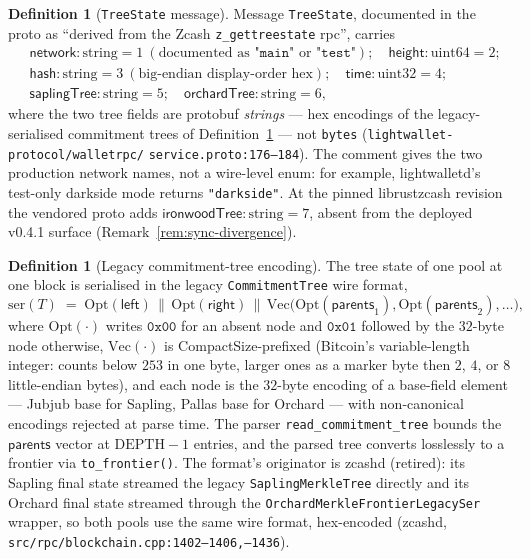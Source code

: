 \documentclass[11pt,a4paper]{article}
\theoremstyle{definition}
\newtheorem{definition}[theorem]{Definition}
\begin{document}
\begin{definition}[\texttt{TreeState} message]\label{def:sync-treestate}
Message \texttt{TreeState}, documented in the proto as ``derived from
the Zcash \texttt{z\_gettreestate} rpc'', carries
\[
\begin{aligned}
&\mathsf{network} : \text{string} = 1
  \ (\text{documented as }\texttt{"main"}\text{ or }\texttt{"test"}); \quad
 \mathsf{height} : \text{uint64} = 2; \\
&\mathsf{hash} : \text{string} = 3
  \ (\text{big-endian display-order hex}); \quad
 \mathsf{time} : \text{uint32} = 4; \\
&\mathsf{saplingTree} : \text{string} = 5; \quad
 \mathsf{orchardTree} : \text{string} = 6,
\end{aligned}
\]
where the two tree fields are protobuf \emph{strings} --- hex encodings
of the legacy-serialised commitment trees of
Definition~\ref{def:sync-legacy-ser} --- not \texttt{bytes}
(\texttt{lightwallet-protocol/walletrpc/}\allowbreak
\texttt{service.proto:176--184}). The comment gives the two production
network names, not a wire-level enum: for example, lightwalletd's test-only
darkside mode returns \texttt{"darkside"}. At
the pinned \textsf{librustzcash} revision the vendored proto adds
$\mathsf{ironwoodTree} : \text{string} = 7$, absent from the deployed
v0.4.1 surface (Remark~\ref{rem:sync-divergence}).
\end{definition}

\begin{definition}[Legacy commitment-tree encoding]\label{def:sync-legacy-ser}
The tree state of one pool at one block is serialised in the legacy
\texttt{CommitmentTree} wire format,
\[
\mathrm{ser}(T) \;=\; \mathrm{Opt}(\mathsf{left}) \,\|\,
\mathrm{Opt}(\mathsf{right}) \,\|\,
\mathrm{Vec}\bigl(\mathrm{Opt}(\mathsf{parents}_1), \mathrm{Opt}(
\mathsf{parents}_2), \ldots\bigr),
\]
where $\mathrm{Opt}(\cdot)$ writes $\mathtt{0x00}$ for an absent node and
$\mathtt{0x01}$ followed by the $32$-byte node otherwise,
$\mathrm{Vec}(\cdot)$ is CompactSize-prefixed (Bitcoin's variable-length
integer: counts below $253$ in one byte, larger ones as a marker byte
then $2$, $4$, or $8$ little-endian bytes), and each node is the
$32$-byte encoding of a base-field element --- Jubjub base for Sapling,
Pallas base for Orchard --- with non-canonical encodings rejected at
parse time. The parser \texttt{read\_commitment\_tree} bounds the
$\mathsf{parents}$ vector at $\mathrm{DEPTH} - 1$ entries, and the parsed
tree converts losslessly to a frontier via \texttt{to\_frontier()}.
The format's originator is \textsf{zcashd} (retired): its Sapling final
state streamed the legacy \texttt{SaplingMerkleTree} directly and its
Orchard final state streamed through the
\texttt{OrchardMerkleFrontierLegacySer} wrapper, so both pools use the
same wire format, hex-encoded
(\textsf{zcashd},
\texttt{src/rpc/blockchain.cpp:1402--1406,--1436}).
\end{definition}
\end{document}
